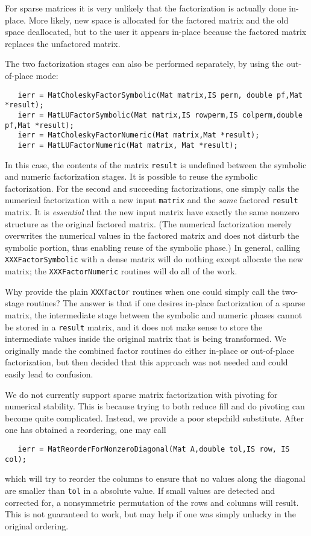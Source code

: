 For sparse matrices it is very unlikely that the factorization 
is actually done in-place. More likely, new space is allocated 
for the factored matrix and the old space deallocated, but to the 
user it appears in-place because the factored matrix replaces
the unfactored matrix.

The 
two  
factorization 
stages  
can also be performed separately, by using the out-of-place mode:
\begin{verbatim}
   ierr = MatCholeskyFactorSymbolic(Mat matrix,IS perm, double pf,Mat *result);
   ierr = MatLUFactorSymbolic(Mat matrix,IS rowperm,IS colperm,double pf,Mat *result);
   ierr = MatCholeskyFactorNumeric(Mat matrix,Mat *result);
   ierr = MatLUFactorNumeric(Mat matrix, Mat *result);
\end{verbatim}
In this case, the contents of the matrix {\tt result} is undefined between 
the symbolic and numeric factorization stages. 
It is possible to reuse the symbolic factorization. For the second and 
succeeding factorizations, one simply calls the numerical factorization with a 
new input {\tt matrix} and the {\em same} factored {\tt result} matrix.
It is {\em essential} that the new input matrix 
have   %
exactly the same nonzero structure as the original factored matrix.
(The numerical factorization merely overwrites the numerical values in the 
factored matrix and does not disturb the symbolic portion, thus enabling
reuse of the symbolic phase.)
In general, calling {\tt XXXFactorSymbolic} with a dense matrix will 
do nothing except allocate the new matrix; the {\tt XXXFactorNumeric} 
routines will do all of the work. 

Why provide the plain {\tt XXXfactor} routines when one could simply 
call the two-stage routines? The answer is that if one desires in-place 
factorization of a sparse matrix, the intermediate stage between the 
symbolic and numeric phases cannot be stored in a {\tt result} matrix, and
it does not make sense to store the intermediate values
inside the original matrix 
that is being transformed.  We originally made the combined factor routines
do either in-place or out-of-place factorization, but then decided that 
this approach was not needed and could easily lead to confusion.

We do not currently support sparse matrix factorization with pivoting
for numerical stability. This is because trying to both reduce fill
and do pivoting can become quite complicated. Instead, we provide a 
poor stepchild substitute. After one has obtained a reordering, one
may call
\begin{verbatim}
   ierr = MatReorderForNonzeroDiagonal(Mat A,double tol,IS row, IS col);
\end{verbatim}
which will try to reorder the columns to ensure that no values along 
the diagonal are smaller than {\tt tol} in a absolute value. If small 
values are detected and corrected for, a nonsymmetric
permutation of the rows and columns will result. This is not guaranteed to work, 
but may help if one was simply unlucky in the original ordering.

